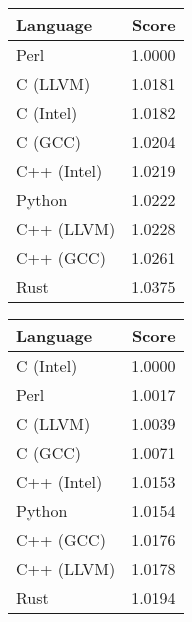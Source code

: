 \begin{subtable}{0.33\textwidth}
    \centering
    \caption{$k=1$}
    \label{table:energy:regexp(1)}
    \begin{tabular}{|l|r|}
        \hline
        Language & Score \\
        \hline
        Perl & 1.0000 \\
        C (LLVM) & 1.0181 \\
        C (Intel) & 1.0182 \\
        C (GCC) & 1.0204 \\
        C++ (Intel) & 1.0219 \\
        Python & 1.0222 \\
        C++ (LLVM) & 1.0228 \\
        C++ (GCC) & 1.0261 \\
        Rust & 1.0375 \\
        \hline
    \end{tabular}
\end{subtable}%
\begin{subtable}{0.33\textwidth}
    \centering
    \caption{$k=2$}
    \label{table:energy:regexp(2)}
    \begin{tabular}{|l|r|}
        \hline
        Language & Score \\
        \hline
        C (Intel) & 1.0000 \\
        Perl & 1.0017 \\
        C (LLVM) & 1.0039 \\
        C (GCC) & 1.0071 \\
        C++ (Intel) & 1.0153 \\
        Python & 1.0154 \\
        C++ (GCC) & 1.0176 \\
        C++ (LLVM) & 1.0178 \\
        Rust & 1.0194 \\
        \hline
    \end{tabular}
\end{subtable}%
